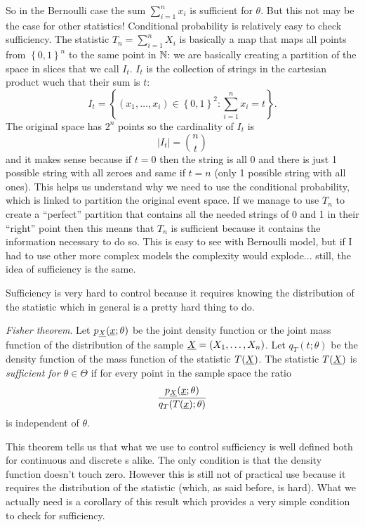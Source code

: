 \documentclass[12pt]{report}
\begin{document}
So in the Bernoulli case the sum $\sum_{i=1}^{n}x_{i}$ is sufficient for $\theta$. But this not may be the case for other statistics! Conditional probability is relatively easy to check sufficiency. The statistic $T_{n}=\sum_{i=1}^{n}X_{i}$ is basically a map that maps all points from $\left\{0,1\right\}^{n}$ to the same point in $\mathbb{N}$: we are basically creating a partition of the space in slices that we call $I_{t}$. $I_{t}$ is the collection of strings in the cartesian product wuch that their sum is $t$:
\begin{equation*}
	I_{t}=\left\{(x_{1},\ldots,x_{i})\in\left\{0,1\right\}^{2}:\sum_{i=1}^{n}x_{i}=t\right\}.
\end{equation*}
The original space has $2^{n}$ points so the cardinality of $I_{t}$ is
\begin{equation*}
	\left|I_{t}\right|={n\choose t}
\end{equation*}
and it makes sense because if $t=0$ then the string is all 0 and there is just 1 possible string with all zeroes and same if $t=n$ (only 1 possible string with all ones). This helps us understand why we need to use the conditional probability, which is linked to partition the original event space. If we manage to use $T_{n}$ to create a ``perfect'' partition that contains all the needed strings of 0 and 1 in their ``right'' point then this means that $T_{n}$ is sufficient because it contains the information necessary to do so. This is easy to see with Bernoulli model, but if I had to use other more complex models the complexity would explode... still, the idea of sufficiency is the same.\par Sufficiency is very hard to control because it requires knowing the distribution of the statistic which in general is a pretty hard thing to do.
\begin{theorem}
	\emph{Fisher theorem}. Let $p_{\underline{X}}(\underline{x};\theta)$ be the joint density function or the joint mass function of the distribution of the sample $\underline{X}=\left(X_{1},\ldots,X_{n}\right)$. Let $q_{T}(t;\theta)$ be the density function of the mass function of the statistic $T(\underline{X})$. The statistic $T(\underline{X})$ is \emph{sufficient for $\theta\in\Theta$} if for every point in the sample space the ratio 
	\begin{equation*}
		\frac{p_{\underline{X}}(\underline{x};\theta)}{q_{T}(T(\underline{x});\theta)}
	\end{equation*}
	is independent of $\theta$.
\end{theorem}
This theorem tells us that what we use to control sufficiency is well defined both for continuous and discrete \rv s alike. The only condition is that the density function doesn't touch zero. However this is still not of practical use because it requires the distribution of the statistic (which, as said before, is hard). What we actually need is a corollary of this result which provides a very simple condition to check for sufficiency.
\end{document}
